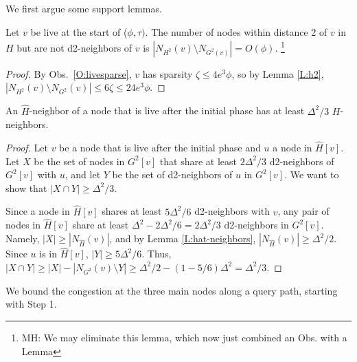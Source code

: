 We first argue some support lemmas.
%


\begin{lemma}
Let $v$ be live at the start of ($\phi,\tau)$.
The number of nodes within distance 2 of $v$ in $H$ but are not d2-neighbors of $v$ is $|N_{H^2}(v) \setminus N_{G^2(v)}| = O(\phi)$.
\footnote{MH: We may eliminate this lemma, which now just combined an Obs. with a Lemma}
\label{L:h4set}
\end{lemma}
%
\begin{proof}
By Obs.~\ref{O:livesparse}, $v$ has sparsity $\zeta \le 4e^3 \phi$, so
by Lemma \ref{L:h2}, $|N_{H^2}(v) \setminus N_{G^2}(v)| \le 6\zeta \le 24 e^3\phi$.
\end{proof}


\begin{lemma}
An $\hat{H}$-neighbor of a node that is live after the initial phase has at least $\Delta^2/3$ $H$-neighbors.
\label{L:H-neighbors}
\end{lemma}

\begin{proof}
Let $v$ be a node that is live after the initial phase and $u$ a node in $\hat{H}[v]$. Let $X$ be the set of nodes in $G^2[v]$ that share at least $2\Delta^2/3$ d2-neighbors of $G^2[v]$ with $u$, and let $Y$ be the set of d2-neighbors of $u$ in $G^2[v]$.
We want to show that $|X \cap Y| \ge \Delta^2/3$.

Since a node in $\hat{H}[v]$ shares at least $5\Delta^2/6$ d2-neighbors with $v$, any pair of nodes in $\hat{H}[v]$ share at least $\Delta^2 - 2\Delta^2/6 = 2\Delta^2/3$ d2-neighbors in $G^2[v]$. Namely, $|X| \ge |N_{\hat{H}}(v)|$, and by Lemma \ref{L:hat-neighbors}, $|N_{\hat{H}}(v)| \ge \Delta^2/2$. 
Since $u$ is in $\hat{H}[v]$, $|Y| \ge 5\Delta^2/6$.
Thus, $|X \cap Y| \ge |X| - |N_{G^2}(v)\setminus Y| \ge \Delta^2/2 - (1-5/6)\Delta^2 = \Delta^2/3$.
\end{proof}

We bound the congestion at the three main nodes along a query path, starting with Step 1.

